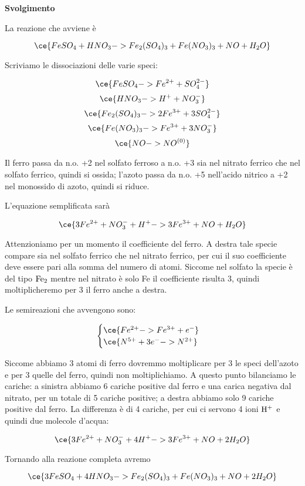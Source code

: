 \vspace{0.2cm}\large\textbf{Svolgimento}\normalsize

\vspace{0.2cm}La reazione che avviene è

$$\ce{FeSO_4 + HNO_3 -> Fe_2(SO_4)_3 + Fe(NO_3)_3 + NO + H_2O}$$

Scriviamo le dissociazioni delle varie speci:

$$\ce{FeSO_4 -> Fe^{2+} + SO_4^{2-}}$$
$$\ce{HNO_3 -> H^+ + NO_3^-}$$
$$\ce{Fe_2(SO_4)_3 -> 2Fe^{3+} + 3SO_4^{2-}}$$
$$\ce{Fe(NO_3)_3 -> Fe^{3+} + 3NO_3^-}$$
$$\ce{NO -> NO^{(0)}}$$

Il ferro passa da n.o. +2 nel solfato ferroso a n.o. +3 sia nel nitrato ferrico che nel solfato ferrico, quindi si ossida; l'azoto passa da n.o. +5 nell'acido nitrico a +2 nel monossido di azoto, quindi si riduce.

L'equazione semplificata sarà

$$\ce{3Fe^{2+} + NO_3^- + H^+ -> 3Fe^{3+} + NO + H_2O}$$

Attenzioniamo per un momento il coefficiente del ferro. A destra tale specie compare sia nel solfato ferrico che nel nitrato ferrico, per cui il suo coefficiente deve essere pari alla somma del numero di atomi. Siccome nel solfato la specie è del tipo $\rm Fe_2$ mentre nel nitrato è solo Fe il coefficiente risulta 3, quindi moltiplicheremo per 3 il ferro anche a destra.

Le semireazioni che avvengono sono:

$$\begin{cases}
    \ce{Fe^{2+} -> Fe^{3+} + e^-}\\
    \ce{N^{5+} +3e^- -> N^{2+}}
\end{cases}$$

Siccome abbiamo 3 atomi di ferro dovremmo moltiplicare per 3 le speci dell'azoto e per 3 quelle del ferro, quindi non moltiplichiamo. A questo punto bilanciamo le cariche: a sinistra abbiamo 6 cariche positive dal ferro e una carica negativa dal nitrato, per un totale di 5 cariche positive; a destra abbiamo solo 9 cariche positive dal ferro. La differenza è di 4 cariche, per cui ci servono 4 ioni $\rm H^+$ e quindi due molecole d'acqua:

$$\ce{3Fe^{2+} + NO_3^- + 4H^+ -> 3Fe^{3+} + NO + 2H_2O}$$

Tornando alla reazione completa avremo

$$\ce{3FeSO_4 + 4HNO_3 -> Fe_2(SO_4)_3 + Fe(NO_3)_3 + NO + 2H_2O}$$

